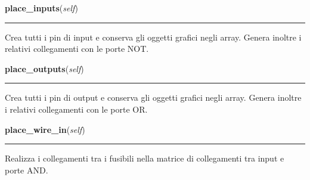 \hspace{.8\funcindent}\begin{boxedminipage}{\funcwidth}

    \raggedright \textbf{place\_inputs}(\textit{self})

    \vspace{-1.5ex}

    \rule{\textwidth}{0.5\fboxrule}
\setlength{\parskip}{2ex}
    Crea tutti i pin di input e conserva gli oggetti grafici negli array. 
    Genera inoltre i relativi collegamenti con le porte NOT.

\setlength{\parskip}{1ex}
    \end{boxedminipage}

    \label{pla:Pla:place_outputs}

    \vspace{0.5ex}

\hspace{.8\funcindent}\begin{boxedminipage}{\funcwidth}

    \raggedright \textbf{place\_outputs}(\textit{self})

    \vspace{-1.5ex}

    \rule{\textwidth}{0.5\fboxrule}
\setlength{\parskip}{2ex}
    Crea tutti i pin di output e conserva gli oggetti grafici negli array. 
    Genera inoltre i relativi collegamenti con le porte OR.

\setlength{\parskip}{1ex}
    \end{boxedminipage}

    \label{pla:Pla:place_wire_in}

    \vspace{0.5ex}

\hspace{.8\funcindent}\begin{boxedminipage}{\funcwidth}

    \raggedright \textbf{place\_wire\_in}(\textit{self})

    \vspace{-1.5ex}

    \rule{\textwidth}{0.5\fboxrule}
\setlength{\parskip}{2ex}
    Realizza i collegamenti tra i fusibili nella matrice di collegamenti 
    tra input e porte AND.

\setlength{\parskip}{1ex}
    \end{boxedminipage}

